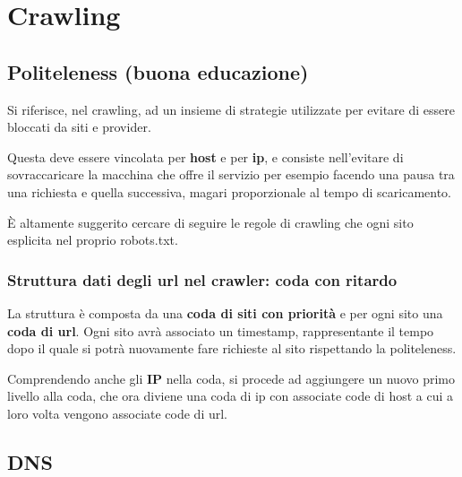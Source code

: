 \documentclass[\main/main.tex]{subfiles}
\begin{document}
\chapter{Crawling}
\section{Politeleness (buona educazione)}
Si riferisce, nel crawling, ad un insieme di strategie utilizzate per evitare di essere bloccati da siti e provider.

Questa deve essere vincolata per \textbf{host} e per \textbf{ip}, e consiste nell'evitare di sovraccaricare la macchina che offre il servizio per esempio facendo una pausa tra una richiesta e quella successiva, magari proporzionale al tempo di scaricamento.

È altamente suggerito cercare di seguire le regole di crawling che ogni sito esplicita nel proprio robots.txt.

\subsection{Struttura dati degli url nel crawler: coda con ritardo}
La struttura è composta da una \textbf{coda di siti con priorità} e per ogni sito una \textbf{coda di url}. Ogni sito avrà associato un timestamp, rappresentante il tempo dopo il quale si potrà nuovamente fare richieste al sito rispettando la politeleness.

Comprendendo anche gli \textbf{IP} nella coda, si procede ad aggiungere un nuovo primo livello alla coda, che ora diviene una coda di ip con associate code di host a cui a loro volta vengono associate code di url.

\section{DNS}
\end{document}
